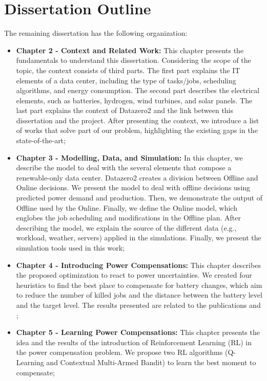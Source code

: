 \section{Dissertation Outline}
The remaining dissertation has the following organization:
\begin{itemize}
    \item[] \textbf{Chapter 2 - Context and Related Work:} This chapter presents the fundamentals to understand this dissertation. Considering the scope of the topic, the context consists of third parts. The first part explains the IT elements of a data center, including the type of tasks/jobs, scheduling algorithms, and energy consumption. The second part describes the electrical elements, such as batteries, hydrogen, wind turbines, and solar panels. The last part explains the context of Datazero2 and the link between this dissertation and the project. After presenting the context, we introduce a list of works that solve part of our problem, highlighting the existing gaps in the state-of-the-art;
    \item[] \textbf{Chapter 3 - Modelling, Data, and Simulation:} In this chapter, we describe the model to deal with the several elements that compose a renewable-only data center. Datazero2 creates a division between Offline and Online decisions. We present the model to deal with offline decisions using predicted power demand and production. Then, we demonstrate the output of Offline used by the Online. Finally, we define the Online model, which englobes the job scheduling and modifications in the Offline plan. After describing the model, we explain the source of the different data (e.g., workload, weather, servers) applied in the simulations. Finally, we present the simulation tools used in this work;
    \item[] \textbf{Chapter 4 - Introducing Power Compensations:} This chapter describes the proposed optimization to react to power uncertainties. We created four heuristics to find the best place to compensate for battery changes, which aim to reduce the number of killed jobs and the distance between the battery level and the target level. The results presented are related to the publications \cite{de2022mixing} and \cite{de2022analyzing};
    \item[] \textbf{Chapter 5 - Learning Power Compensations:} This chapter presents the idea and the results of the introduction of Reinforcement Learning (RL) in the power compensation problem. We propose two RL algorithms (Q-Learning and Contextual Multi-Armed Bandit) to learn the best moment to compensate;

\end{itemize}
